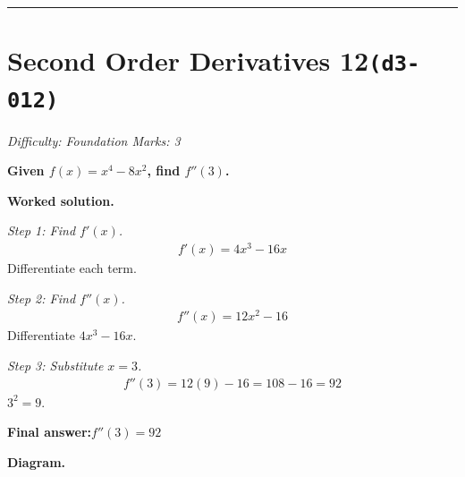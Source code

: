 \documentclass[11pt]{article}
\newcommand{\question}[1]{\par\medskip\noindent\textbf{#1}\par}
\begin{document}
\medskip\hrule

\section*{Second Order Derivatives 12\quad\small\texttt{(d3-012)}}
\textit{Difficulty: Foundation \quad\textbar\quad Marks: 3}

\question{Given \( f(x) = x^4 - 8x^2 \), find \( f''(3) \).}

\textbf{Worked solution.}

\textit{Step 1: Find \( f'(x) \).}
\[\begin{gathered}
f'(x) = 4x^3 - 16x
\end{gathered}\]
Differentiate each term.

\textit{Step 2: Find \( f''(x) \).}
\[\begin{gathered}
f''(x) = 12x^2 - 16
\end{gathered}\]
Differentiate \(4x^3 - 16x\).

\textit{Step 3: Substitute \( x = 3 \).}
\[\begin{gathered}
f''(3) = 12(9) - 16 = 108 - 16 = 92
\end{gathered}\]
\( 3^2 = 9 \).

\begin{answerbox}
\textbf{Final answer:}\quad \(\displaystyle  f''(3) = 92 \)
\end{answerbox}
\textbf{Diagram.}
\end{document}
